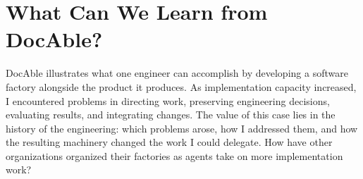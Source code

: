 \section{What Can We Learn from DocAble?}\label{heading:liability}


DocAble illustrates what one engineer can accomplish by developing a software factory alongside the product it produces. As implementation capacity increased, I encountered problems in directing work, preserving engineering decisions, evaluating results, and integrating changes. The value of this case lies in the history of the engineering: which problems arose, how I addressed them, and how the resulting machinery changed the work I could delegate. How have other organizations organized their factories as agents take on more implementation work?
